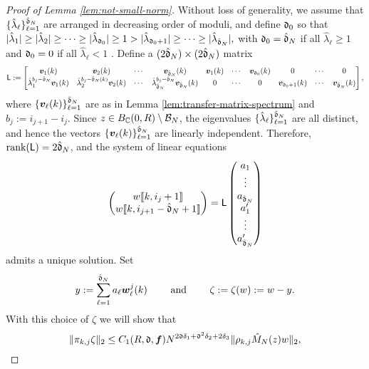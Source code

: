 \documentclass{amsart}
\numberwithin{equation}{section}
\def\corEE{\textcolor{amethyst}}
\def\corEE{}
\def\corAB{}
\begin{document}
\begin{proof}[Proof of Lemma \ref{lem:not-small-norm}]
\corEE{Without loss of generality, we
assume that $\{\hat{\lambda}_\ell\}_{\ell=1}^{\hat{\mathfrak{d}}_N}$ are arranged in decreasing order of moduli, and define $\mathfrak{d}_0$ so that
\(
|\hat{\lambda}_1| \ge |\hat{\lambda}_2| \ge \cdots \ge |\hat{\lambda}_{\mathfrak{d}_0}|
\ge 1 > |\hat{\lambda}_{\mathfrak{d}_0+1}| \ge \cdots \ge |\hat{\lambda}_{\hat{\mathfrak{d}}_N}|,
\)
with $\mathfrak{d}_0 = \hat{\mathfrak{d}}_N$ if all $\hat\lambda_\ell \geq 1$
and $\mathfrak{d}_0 = 0$ if all $\hat\lambda_\ell < 1$
.} Define a $(2\hat{\mathfrak{d}}_N) \times (2\hat{\mathfrak{d}}_N)$ matrix
\[
\corAB{
{\sf L}:=
\begin{bmatrix}
{\bm v}_1(k)  &{\bm v}_2(k)  & \cdots & {\bm v}_{\hat\gd_N}(k) &
{\bm v}_1(k)   & \cdots & {\bm v}_{\gd_0}(k)& 0 & \cdots &0\\
\hat{\lambda}_1^{b_j-\hat\gd_N}{\bm v}_1(k)  &\hat{\lambda}_2^{b_j-\hat\gd_N(k)}{\bm v}_2(k)  & \cdots & \hat{\lambda}_{\corEE{\hat\gd_N}}^{b_j-\hat\gd_N}{\bm v}_{\hat\gd_N}(k)  &
0   & \cdots & 0& {\bm v}_{\gd_0+1}(k)& \cdots & {\bm v}_{\hat\gd_N}(k)
\end{bmatrix},
}\]
where $\{{\bm v}_\ell(k)\}_{\ell=1}^{\hat{\mathfrak{d}}_N}$ are as in Lemma \ref{lem:transfer-matrix-spectrum} and $b_j:=i_{j+1}-i_j$.
Since $z \in B_{\mathbb{C}}(0,R)\setminus \mathcal{B}_N$,
the eigenvalues $\{\hat{\lambda}_\ell\}_{\ell=1}^{\hat{\mathfrak{d}}_N}$ are all distinct, and hence the vectors $\{{\bm v}_\ell(k)\}_{\ell=1}^{\hat{\mathfrak{d}}_N}$ are linearly independent. Therefore,
$\text{rank}({\sf L})=2\hat{\mathfrak{d}}_N$, and the system of linear equations
\begin{equation}\label{eq:lin-system-eqn-be}
\begin{pmatrix} w\dvec{k, i_j+1}\\ w\dvec{k,i_{j+1}-\corEE{\hat\gd_N}+1}\end{pmatrix} ={\sf L} \begin{pmatrix} a_1 \\ \vdots \\ a_{\hat\gd_N} \\ a_1' \\ \vdots \\ a_{\hat\gd_N}' \end{pmatrix}
\end{equation}
admits a unique solution. Set
\[
y:= \sum_{\ell=1}^{\hat{\mathfrak{d}}_N} a_\ell {\bm w}_\ell^j(k) \qquad \text{ and } \qquad \zeta:=\zeta(w):=w - y.
\]
With this choice of $\zeta$ we will show that
\begin{equation}\label{eq:zeta-lbd-norm}
\|\pi_{k,j}\zeta\|_2 \le C_1(R,\gd, {\bm f}) N^{2\gd\delta_1+ \gd^2 \delta_2+2\delta_3} \|\rho_{k,j} \hat{M}_N(z) w\|_2,

\end{equation}
\end{proof}
\end{document}
